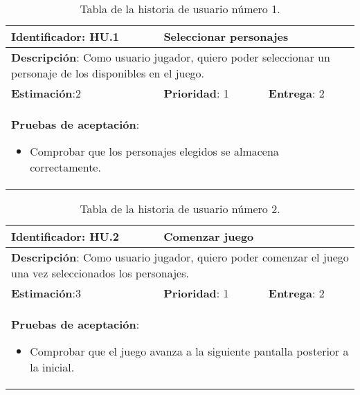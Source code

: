 \begin{table}[h]
  \begin{center}
    \begin{tabular}{|p{4cm}|p{4cm}|p{4cm}|}

    \hline
    \textbf{Identificador}: HU.1
    & \multicolumn{2}{p{8cm}|}{Seleccionar personajes}\\

    \hline
    \multicolumn{3}{|p{12cm}|}{\textbf{Descripción}: Como usuario jugador, quiero poder seleccionar un personaje de los disponibles en el juego.}\\

    \hline
    \textbf{Estimación}:2
    & \textbf{Prioridad}: 1
    & \textbf{Entrega}: 2\\

    \hline
    \multicolumn{3}{|p{12cm}|}{\textbf{Pruebas de aceptación}:
      \begin{itemize}
        \item Comprobar que los personajes elegidos se almacena correctamente.
      \end{itemize}
    }\\

    \hline

    \end{tabular}

    \caption{Tabla de la historia de usuario número 1.}
    \label{tabla-hu1}

  \end{center}
\end{table}

\begin{table}[h]
  \begin{center}
    \begin{tabular}{|p{4cm}|p{4cm}|p{4cm}|}

    \hline
    \textbf{Identificador}: HU.2
    & \multicolumn{2}{p{8cm}|}{Comenzar juego}\\

    \hline
    \multicolumn{3}{|p{12cm}|}{\textbf{Descripción}: Como usuario jugador, quiero poder comenzar el juego una vez seleccionados los personajes.}\\

    \hline
    \textbf{Estimación}:3
    & \textbf{Prioridad}: 1
    & \textbf{Entrega}: 2\\

    \hline
    \multicolumn{3}{|p{12cm}|}{\textbf{Pruebas de aceptación}:
      \begin{itemize}
        \item Comprobar que el juego avanza a la siguiente pantalla posterior a la inicial.
      \end{itemize}
    }\\

    \hline

    \end{tabular}

    \caption{Tabla de la historia de usuario número 2.}
    \label{tabla-hu2}

  \end{center}
\end{table}

